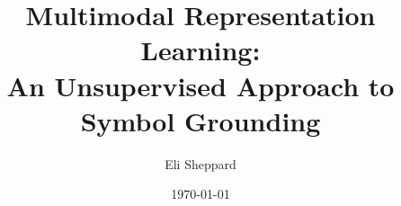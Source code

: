 \documentclass[titlepage,shield]{hwthesis}
\let\oldapp\appendix
\renewcommand{\appendix}{\oldapp\renewcommand*{\chaptername}{\appendixname}}
\begin{document}

\title{Multimodal Representation Learning: \\ An Unsupervised Approach to Symbol Grounding}


\date{\today} %

\author{Eli Sheppard} %


\maketitle
{}
\ifx\submissiontype\firstsub%
\mbox{}
\fi%

\begin{abstract}

\end{abstract}
\ifx\submissiontype\firstsub%
\mbox{}
\fi%

\clearpage
\ifx\submissiontype\firstsub%
\mbox{}
\clearpage
\fi%

\begin{acknowledgements}

\end{acknowledgements}
\ifx\submissiontype\firstsub%
\mbox{}
\fi%

\ifx\submissiontype\arxivsub%
\relax
\else%

\ifx\submissiontype\firstsub%
\mbox{}
\fi%
\fi%

\clearpage

\setcounter{page}{1}

\tableofcontents


\clearpage
{}


 
 

 
 

% 


\appendix 







\clearpage
\end{document}

